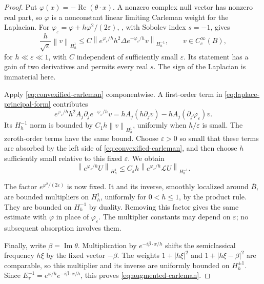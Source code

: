 \documentclass[11pt]{article}
\newcommand{\norm}[1]{\left\lVert #1\right\rVert}
\newcommand{\abs}[1]{\left\lvert #1\right\rvert}
\newcommand{\Lcal}{\mathcal L}
\theoremstyle{remark}
\numberwithin{equation}{section}
\begin{document}
\begin{proof}
Put $\varphi(x)=-\operatorname{Re}(\theta\cdot x)$. A nonzero complex
null vector has nonzero real part, so $\varphi$ is a nonconstant linear
limiting Carleman weight for the Laplacian. For
$\varphi_\varepsilon=\varphi+h\varphi^2/(2\varepsilon)$,
\cite[Lemma~2.1]{SaloTzou2009}, with Sobolev index $s=-1$, gives
\begin{equation}
\label{eq:convexified-carleman}
 \frac{h}{\sqrt\varepsilon}\norm{v}_{H_h^1}
 \le C\norm{e^{\varphi_\varepsilon/h}h^2\Delta
                 e^{-\varphi_\varepsilon/h}v}_{H_h^{-1}},
 \qquad v\in C_c^\infty(B),
\end{equation}
for $h\ll\varepsilon\ll1$, with $C$ independent of sufficiently small
$\varepsilon$. Its statement has a gain of two derivatives and permits
every real $s$. The sign of the Laplacian is immaterial here.

Apply \eqref{eq:convexified-carleman} componentwise. A first-order term
in \eqref{eq:laplace-principal-form} contributes
\[
 e^{\varphi_\varepsilon/h}h^2A_j\partial_j
       e^{-\varphi_\varepsilon/h}v
 =hA_j(h\partial_jv)-hA_j(\partial_j\varphi_\varepsilon)v.
\]
Its $H_h^{-1}$ norm is bounded by $C_1h\norm{v}_{H_h^1}$,
uniformly when $h/\varepsilon$ is small. The zeroth-order terms have
the same bound. Choose $\varepsilon>0$ so small that these terms are
absorbed by the left side of \eqref{eq:convexified-carleman}, and then
choose $h$ sufficiently small relative to this fixed $\varepsilon$.
We obtain
\[
 \norm{e^{\varphi_\varepsilon/h}U}_{H_h^1}
 \le C_\varepsilon h
       \norm{e^{\varphi_\varepsilon/h}\Lcal U}_{H_h^{-1}}.
\]

The factor $e^{\varphi^2/(2\varepsilon)}$ is now fixed. It and its
inverse, smoothly localized around $\overline B$, are bounded
multipliers on $H_h^1$, uniformly for $0<h\le1$, by the product rule.
They are bounded on $H_h^{-1}$ by duality. Removing this factor gives
the same estimate with $\varphi$ in place of $\varphi_\varepsilon$.
The multiplier constants may depend on $\varepsilon$; no subsequent
absorption involves them.

Finally, write $\beta=\operatorname{Im}\theta$.
Multiplication by $e^{-i\beta\cdot x/h}$ shifts the semiclassical
frequency $h\xi$ by the fixed vector $-\beta$. The weights
$1+\abs{h\xi}^2$ and $1+\abs{h\xi-\beta}^2$ are comparable,
so this multiplier and its inverse are uniformly bounded on
$H_h^{\pm1}$. Since
$E_\tau^{-1}=e^{\varphi/h}e^{-i\beta\cdot x/h}$, this proves
\eqref{eq:augmented-carleman}.
\end{proof}
\end{document}
